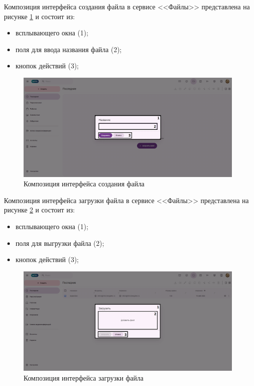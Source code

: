 Композиция интерфейса создания файла в сервисе <<Файлы>> представлена на рисунке \ref{templ:image9b} и состоит из:
\begin{itemize}
  \item всплывающего окна (1);
  \item поля для ввода названия файла (2);
  \item кнопок действий (3);
\end{itemize}
\begin{figure}[H]
	\centering
	\includegraphics[width=1\linewidth]{images/файлы2}
	\caption{Композиция интерфейса создания файла}
	\label{templ:image9b}
\end{figure}

Композиция интерфейса загрузки файла в сервисе <<Файлы>> представлена на рисунке \ref{templ:image9c} и состоит из:
\begin{itemize}
  \item всплывающего окна (1);
  \item поля для выгрузки файла (2);
  \item кнопок действий (3);
\end{itemize}
\begin{figure}[H]
	\centering
	\includegraphics[width=1\linewidth]{images/файлы3}
	\caption{Композиция интерфейса загрузки файла}
	\label{templ:image9c}
\end{figure}

